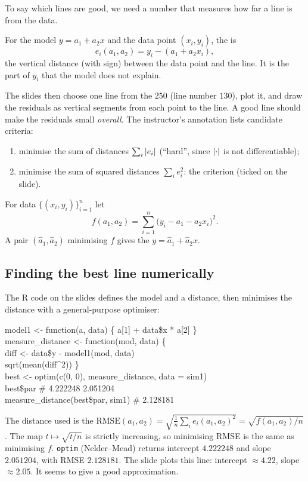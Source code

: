 To say which lines are good, we need a number that measures how far a line is from the data.
\begin{definition}[Residual]\label{def:L05-residual}
For the model $y=a_1+a_2x$ and the data point $(x_i,y_i)$, the  is
\[
e_i(a_1,a_2)=y_i-(a_1+a_2x_i),
\]
the vertical distance (with sign) between the data point and the line. It is the part of $y_i$
that the model does not explain.
\end{definition}

The slides then choose one line from the $250$ (line number $130$), plot it, and draw the
residuals as vertical segments from each point to the line. A good line should make the
residuals small \emph{overall}. The instructor's annotation lists candidate criteria:
\begin{enumerate}
  \item minimise the sum of distances $\sum_i \left|e_i\right|$ (``hard'', since $\left|\cdot\right|$ is not differentiable);
  \item minimise the sum of squared distances $\sum_i e_i^2$: the  criterion (ticked on the slide).
\end{enumerate}

\begin{definition}\label{def:L05-LS}
For data $\{(x_i,y_i)\}_{i=1}^n$ let
\[
f(a_1,a_2)=\sum_{i=1}^n \bigl(y_i-a_1-a_2x_i\bigr)^2 .
\]
A pair $(\hat a_1,\hat a_2)$ minimising $f$ gives the 
$y=\hat a_1+\hat a_2 x$.
\end{definition}

\subsection{Finding the best line numerically}
The R code on the slides defines the model and a distance, then minimises the distance with a
general-purpose optimiser:
\begin{center}
\begin{minipage}{0.8\textwidth}\small\ttfamily
model1 <- function(a, data) \{ a[1] + data\$x * a[2] \}\\
measure\_distance <- function(mod, data) \{\\
\quad diff <- data\$y - model1(mod, data)\\
\quad sqrt(mean(diff\textasciicircum 2)) \}\\
best <- optim(c(0, 0), measure\_distance, data = sim1)\\
best\$par \qquad\qquad \# 4.222248 2.051204\\
measure\_distance(best\$par, sim1) \# 2.128181
\end{minipage}
\end{center}
The distance used is the 
$\mathrm{RMSE}(a_1,a_2)=\sqrt{\tfrac1n\sum_i e_i(a_1,a_2)^2}=\sqrt{f(a_1,a_2)/n}$. The map
$t\mapsto\sqrt{t/n}$ is strictly increasing, so minimising RMSE is the same as minimising $f$.
\texttt{optim} (Nelder--Mead) returns intercept $4.222248$ and slope $2.051204$, with
RMSE $2.128181$. The slide plots this line: intercept $\approx 4.22$, slope $\approx 2.05$. It
seems to give a good approximation.

